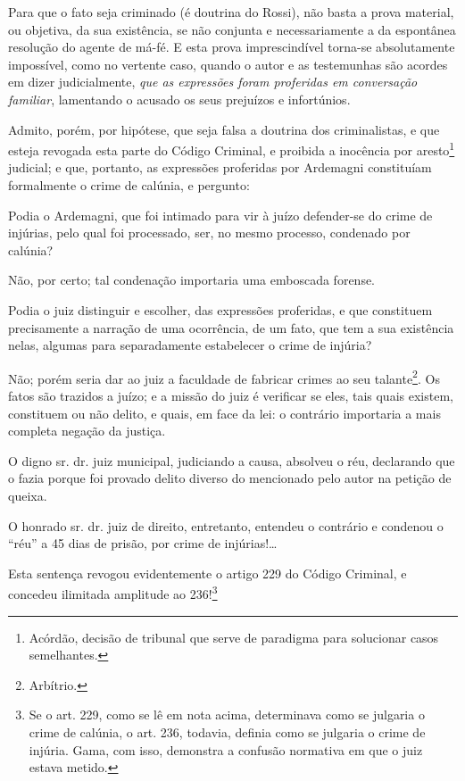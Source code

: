 {\begin{flushright}
Para que o fato seja criminado (é doutrina do Rossi), não basta a prova
material, ou objetiva, da sua existência, se não conjunta e
necessariamente a da espontânea resolução do agente de má-fé. E esta
prova imprescindível torna-se absolutamente impossível, como no vertente
caso, quando o autor e as testemunhas são acordes em dizer
judicialmente, \emph{que as expressões foram proferidas em conversação
familiar}, lamentando o acusado os seus prejuízos e infortúnios.

Admito, porém, por hipótese, que seja falsa a doutrina dos
criminalistas, e que esteja revogada esta parte do Código Criminal, e
proibida a inocência por aresto\footnote{ Acórdão, decisão de tribunal
  que serve de paradigma para solucionar casos semelhantes.} judicial; e
que, portanto, as expressões proferidas por Ardemagni constituíam
formalmente o crime de calúnia, e pergunto:

Podia o Ardemagni, que foi intimado para vir à juízo defender-se do
crime de injúrias, pelo qual foi processado, ser, no mesmo processo,
condenado por calúnia?

Não, por certo; tal condenação importaria uma emboscada forense.

Podia o juiz distinguir e escolher, das expressões proferidas, e que
constituem precisamente a narração de uma ocorrência, de um fato, que
tem a sua existência nelas, algumas para separadamente estabelecer o
crime de injúria?

Não; porém seria dar ao juiz a faculdade de fabricar crimes ao seu
talante\footnote{ Arbítrio.}. Os fatos são trazidos a juízo; e a missão
do juiz é verificar se eles, tais quais existem, constituem ou não
delito, e quais, em face da lei: o contrário importaria a mais completa
negação da justiça.

O digno sr. dr. juiz municipal, judiciando a causa, absolveu o réu,
declarando que o fazia porque foi provado delito diverso do mencionado
pelo autor na petição de queixa.

O honrado sr. dr. juiz de direito, entretanto, entendeu o contrário e
condenou o ``réu'' a 45 dias de prisão, por crime de injúrias!\ldots{}

Esta sentença revogou evidentemente o artigo 229 do Código Criminal, e
concedeu ilimitada amplitude ao 236!\footnote{ Se o art. 229, como se
  lê em nota acima, determinava como se julgaria o crime de calúnia, o
  art. 236, todavia, definia como se julgaria o crime de injúria. Gama,
  com isso, demonstra a confusão normativa em que o juiz estava metido.}


\end{flushright}}
